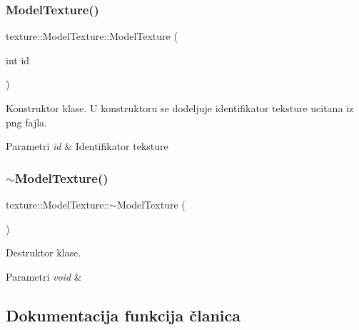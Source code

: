 \subsubsection{\texorpdfstring{Model\+Texture()}{ModelTexture()}}
{\footnotesize\ttfamily texture\+::\+Model\+Texture\+::\+Model\+Texture (\begin{DoxyParamCaption}\item[{int}]{id }\end{DoxyParamCaption})}



Konstruktor klase. U konstruktoru se dodeljuje identifikator teksture ucitana iz png fajla. 


\begin{DoxyParams}{Parametri}
{\em id} & Identifikator teksture \\
\hline
\end{DoxyParams}
\mbox{\label{classtexture_1_1ModelTexture_ab0ce63043b8241b064a2c233ec24bfae}} 
\subsubsection{\texorpdfstring{$\sim$\+Model\+Texture()}{~ModelTexture()}}
{\footnotesize\ttfamily texture\+::\+Model\+Texture\+::$\sim$\+Model\+Texture (\begin{DoxyParamCaption}{ }\end{DoxyParamCaption})}



Destruktor klase. 


\begin{DoxyParams}{Parametri}
{\em void} & \\
\hline
\end{DoxyParams}


\subsection{Dokumentacija funkcija članica}
\mbox{\label{classtexture_1_1ModelTexture_adc0735b6b9c1df9f2c525f0663306cd3}} 

